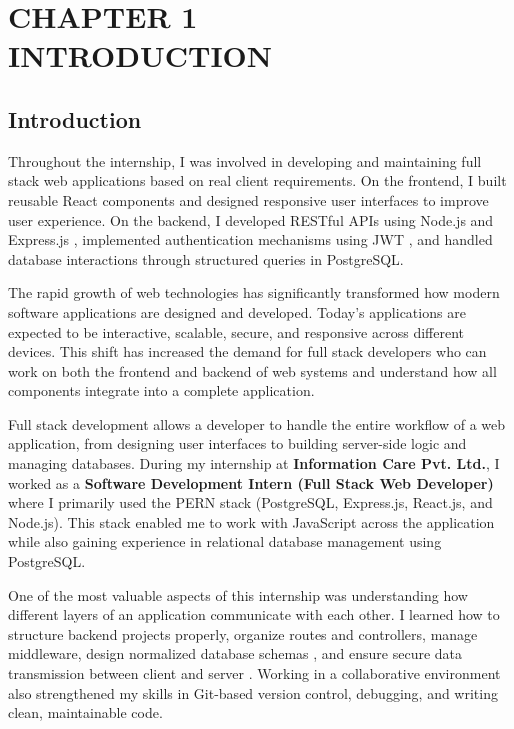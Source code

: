 \section*{\Large\centering \textbf{CHAPTER 1 \\ INTRODUCTION }}
\setcounter{section}{1}

\subsection{Introduction}
Throughout the internship, I was involved in developing and maintaining full stack web applications based on real client requirements. On the frontend, I built reusable React components and designed responsive user interfaces to improve user experience. On the backend, I developed RESTful APIs using Node.js and Express.js \parencite{Fielding2000}, implemented authentication mechanisms using JWT \parencite{Jones2015}, and handled database interactions through structured queries in PostgreSQL.

The rapid growth of web technologies has significantly transformed how modern software applications are designed and developed. Today’s applications are expected to be interactive, scalable, secure, and responsive across different devices. This shift has increased the demand for full stack developers who can work on both the frontend and backend of web systems and understand how all components integrate into a complete application.

Full stack development allows a developer to handle the entire workflow of a web application, from designing user interfaces to building server-side logic and managing databases. During my internship at \textbf{Information Care Pvt. Ltd.}, I worked as a \textbf{Software Development Intern (Full Stack Web Developer)} where I primarily used the PERN stack (PostgreSQL, Express.js, React.js, and Node.js). This stack enabled me to work with JavaScript across the application while also gaining experience in relational database management using PostgreSQL.

One of the most valuable aspects of this internship was understanding how different layers of an application communicate with each other. I learned how to structure backend projects properly, organize routes and controllers, manage middleware, design normalized database schemas \parencite{Codd1970}, and ensure secure data transmission between client and server \parencite{McGraw2006}. Working in a collaborative environment also strengthened my skills in Git-based version control, debugging, and writing clean, maintainable code.

